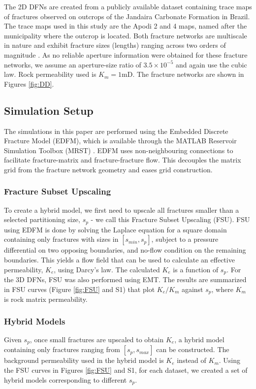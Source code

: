 \documentclass[draft]{agujournal2018}
\begin{document}
The 2D DFNs are created from a publicly available dataset containing trace maps of fractures observed on outcrops of the Jandaira Carbonate Formation in Brazil. The trace maps used in this study are the Apodi 2 and 4 maps, named after the municipality where the outcrop is located. Both fracture networks are multiscale in nature and exhibit fracture sizes (lengths) ranging across two orders of magnitude \citep{Bisdom2017}. As no reliable aperture information were obtained for these fracture networks, we assume an aperture-size ratio of $3.5\times 10^{-5}$ and again use the cubic law. Rock permeability used is $K_m=1$mD. The fracture networks are shown in Figures \ref{fig:DD}.


\subsection{Simulation Setup}
The simulations in this paper are performed using the Embedded Discrete Fracture Model (EDFM), which is available through the MATLAB Reservoir Simulation Toolbox (MRST) \citep{Lee2001, Lie2015, Moinfar2013, Shah2016}. EDFM uses non-neighbouring connections to facilitate fracture-matrix and fracture-fracture flow. This decouples the matrix grid from the fracture network geometry and eases grid construction. 

\subsubsection{Fracture Subset Upscaling}
To create a hybrid model, we first need to upscale all fractures smaller than a selected partitioning size, $s_p$ - we call this Fracture Subset Upscaling (FSU). FSU using EDFM is done by solving the Laplace equation for a square domain containing only fractures with sizes in $[s_{min},s_p]$, subject to a pressure differential on two opposing boundaries, and no-flow condition on the remaining boundaries. This yields a flow field that can be used to calculate an effective permeability, $K_{e}$, using Darcy's law. The calculated $K_{e}$ is a function of $s_p$. For the 3D DFNs, FSU was also performed using EMT. The results are summarized in FSU curves (Figure \ref{fig:FSU} and S1) that plot $K_{e}/K_m$ against $s_p$, where $K_m$ is rock matrix permeability.

\subsubsection{Hybrid Models}
Given $s_p$, once small fractures are upscaled to obtain $K_e$, a hybrid model containing only fractures ranging from $[s_p,s_{max}]$ can be constructed. The background permeability used in the hybrid model is $K_e$ instead of $K_m$. Using the FSU curves in Figures \ref{fig:FSU} and S1, for each dataset, we created a set of hybrid models corresponding to different $s_p$. 
\end{document}
